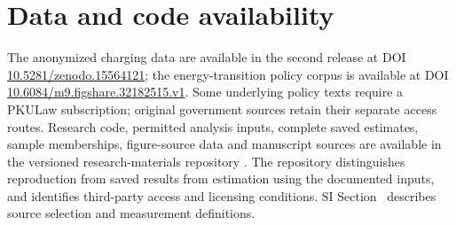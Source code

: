 \section*{Data and code availability}
The anonymized charging data are available in the second release at DOI \url{10.5281/zenodo.15564121}; the energy-transition policy corpus is available at DOI \url{10.6084/m9.figshare.32182515.v1}. Some underlying policy texts require a PKULaw subscription; original government sources retain their separate access routes. Research code, permitted analysis inputs, complete saved estimates, sample memberships, figure-source data and manuscript sources are available in the versioned research-materials repository \citep{gao2026materials}. The repository distinguishes reproduction from saved results from estimation using the documented inputs, and identifies third-party access and licensing conditions. SI Section~ describes source selection and measurement definitions.
